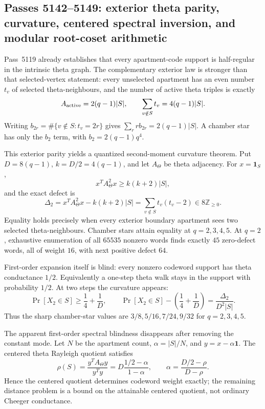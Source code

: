 \ifdefined\WPassFiveOneFourTwoLoaded\else
\gdef\WPassFiveOneFourTwoLoaded{1}
\subsection*{Passes 5142--5149: exterior theta parity, curvature, centered spectral inversion, and modular root-coset arithmetic}
Pass~5119 already establishes that every apartment-code support is half-regular in the intrinsic theta graph.  The complementary exterior law is stronger than that selected-vertex statement: every unselected apartment has an even number $t_v$ of selected theta-neighbours, and the number of active theta triples is exactly
\[
A_{\rm active}=2(q-1)|S|,
\qquad
\sum_{v\notin S}t_v=4(q-1)|S|.
\]
Writing $b_{2r}=\#\{v\notin S:t_v=2r\}$ gives $\sum_r r b_{2r}=2(q-1)|S|$.  A chamber star has only the $b_2$ term, with $b_2=2(q-1)q^4$.

This exterior parity yields a quantized second-moment curvature theorem.  Put $D=8(q-1)$, $k=D/2=4(q-1)$, and let $A_\Theta$ be theta adjacency.  For $x=\mathbf1_S$,
\[
x^T A_\Theta^2 x\ge k(k+2)|S|,
\]
and the exact defect is
\[
\Delta_2=x^T A_\Theta^2x-k(k+2)|S|
       =\sum_{v\notin S}t_v(t_v-2)\in8\mathbb Z_{\ge0}.
\]
Equality holds precisely when every exterior boundary apartment sees two selected theta-neighbours.  Chamber stars attain equality at $q=2,3,4,5$.  At $q=2$, exhaustive enumeration of all $65535$ nonzero words finds exactly $45$ zero-defect words, all of weight $16$, with next positive defect $64$.

First-order expansion itself is blind: every nonzero codeword support has theta conductance $1/2$.  Equivalently a one-step theta walk stays in the support with probability $1/2$.  At two steps the curvature appears:
\[
\Pr[X_2\in S]\ge\frac14+\frac1D,
\qquad
\Pr[X_2\in S]-\left(\frac14+\frac1D\right)
=\frac{\Delta_2}{D^2|S|}.
\]
Thus the sharp chamber-star values are $3/8,5/16,7/24,9/32$ for $q=2,3,4,5$.

The apparent first-order spectral blindness disappears after removing the constant mode.  Let $N$ be the apartment count, $\alpha=|S|/N$, and $y=x-\alpha\mathbf1$.  The centered theta Rayleigh quotient satisfies
\[
\rho(S)=\frac{y^TA_\Theta y}{y^Ty}
       =D\frac{1/2-\alpha}{1-\alpha},
\qquad
\alpha=\frac{D/2-\rho}{D-\rho}.
\]
Hence the centered quotient determines codeword weight exactly; the remaining distance problem is a bound on the attainable centered quotient, not ordinary Cheeger conductance.

